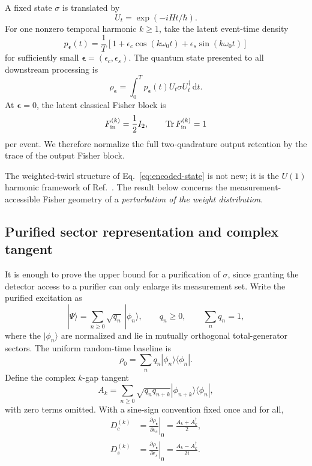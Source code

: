 \documentclass[aps,pra,reprint,amsmath,amssymb,longbibliography]{revtex4-2}
\newcommand{\Tr}{\operatorname{Tr}}
\newcommand{\dd}{\mathrm{d}}
\begin{document}
A fixed state $\sigma$ is translated by
\begin{equation}
 U_t=\exp(-iHt/\hbar).
\end{equation}
For one nonzero temporal harmonic $k\geq1$, take the latent event-time density
\begin{equation}
 p_{\bm\epsilon}(t)=\frac1T\left[1+\epsilon_c\cos(k\omega_0t)+\epsilon_s\sin(k\omega_0t)\right]
 \label{eq:latent-density}
\end{equation}
for sufficiently small $\bm\epsilon=(\epsilon_c,\epsilon_s)$.  The quantum state presented to all downstream processing is
\begin{equation}
 \rho_{\bm\epsilon}=\int_0^T p_{\bm\epsilon}(t)
 U_t\sigma U_t^\dagger\,\dd t .
 \label{eq:encoded-state}
\end{equation}
At $\bm\epsilon=0$, the latent classical Fisher block is
\begin{equation}
 F_{\rm in}^{(k)}=\frac12 I_2,
 \qquad \Tr F_{\rm in}^{(k)}=1
 \label{eq:input-FI}
\end{equation}
per event.  We therefore normalize the full two-quadrature output retention by the trace of the output Fisher block.

The weighted-twirl structure of Eq.~\eqref{eq:encoded-state} is not new; it is the $U(1)$ harmonic framework of Ref.~\cite{MarvianSpekkens2014Modes}.  The result below concerns the measurement-accessible Fisher geometry of a \emph{perturbation of the weight distribution}.

\subsection{Purified sector representation and complex tangent}

It is enough to prove the upper bound for a purification of $\sigma$, since granting the detector access to a purifier can only enlarge its measurement set.  Write the purified excitation as
\begin{equation}
 |\Psi\rangle=\sum_{n\geq0}\sqrt{q_n}\,|\phi_n\rangle,
 \qquad
 q_n\geq0,
 \qquad
 \sum_n q_n=1,
 \label{eq:pure-sector-state}
\end{equation}
where the $|\phi_n\rangle$ are normalized and lie in mutually orthogonal total-generator sectors.  The uniform random-time baseline is
\begin{equation}
 \rho_0=\sum_n q_n|\phi_n\rangle\langle\phi_n|.
 \label{eq:twirled-baseline}
\end{equation}
Define the complex $k$-gap tangent
\begin{equation}
 A_k=\sum_{n\geq0}\sqrt{q_nq_{n+k}}
 |\phi_{n+k}\rangle\langle\phi_n|,
 \label{eq:Ak}
\end{equation}
with zero terms omitted.  With a sine-sign convention fixed once and for all,
\begin{align}
 D_c^{(k)}&=\left.\frac{\partial\rho_{\bm\epsilon}}{\partial\epsilon_c}\right|_0
 =\frac{A_k+A_k^\dagger}{2},\\
 D_s^{(k)}&=\left.\frac{\partial\rho_{\bm\epsilon}}{\partial\epsilon_s}\right|_0
 =\frac{A_k-A_k^\dagger}{2i}.
 \label{eq:real-tangents}
\end{align}
\end{document}

